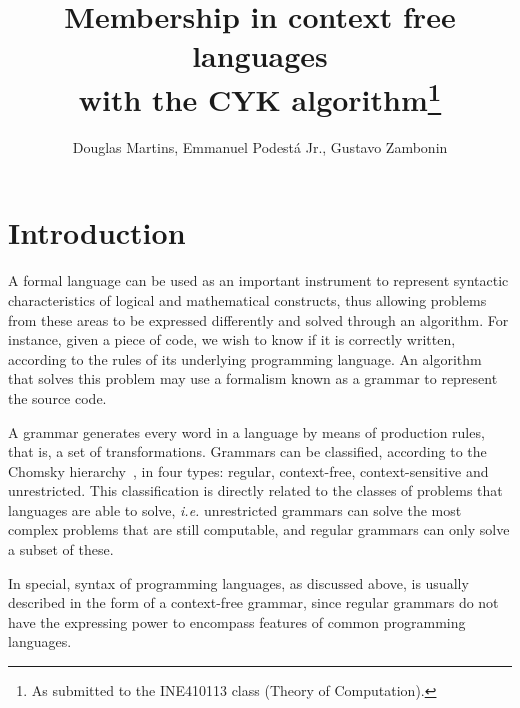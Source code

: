 \documentclass[12pt]{article}
\title{Membership in context free languages \\ with the CYK algorithm\footnote{
    As submitted to the INE410113 class (Theory of Computation).}}
\author{Douglas Martins\inst{1}, Emmanuel Podestá Jr.\inst{1}, Gustavo Zambonin\inst{1}}
\begin{document}
 

\maketitle

\section{Introduction}\label{sec:intro}
A formal language can be used as an important instrument to represent syntactic characteristics of logical and mathematical constructs, thus allowing problems from these areas to be expressed differently and solved through an algorithm. For instance, given a piece of code, we wish to know if it is correctly written, according to the rules of its underlying programming language. An algorithm that solves this problem may use a formalism known as a grammar to represent the source code.

A grammar generates every word in a language by means of production rules, that is, a set of transformations. Grammars can be classified, according to the Chomsky hierarchy~\cite{}, in four types: regular, context-free, context-sensitive and unrestricted. This classification is directly related to the classes of problems that languages are able to solve, \emph{i.e.} unrestricted grammars can solve the most complex problems that are still computable, and regular grammars can only solve a subset of these.

In special, syntax of programming languages, as discussed above, is usually described in the form of a context-free grammar, since regular grammars do not have the expressing power to encompass features of common programming languages.




\end{document}
